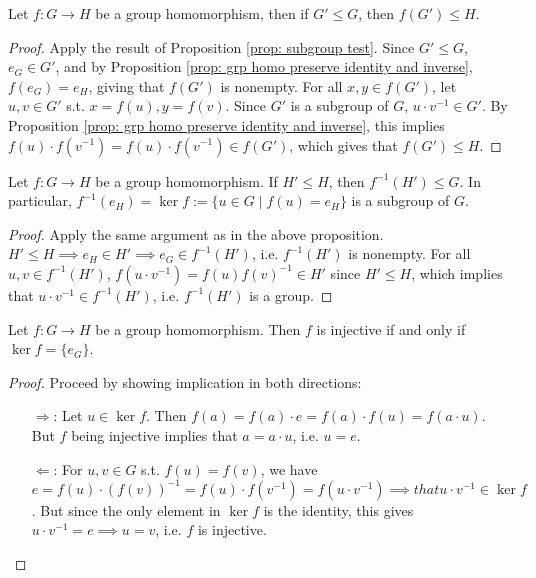 \begin{proposition}
    Let $f: G \to H$ be a group homomorphism, then if $G' \leq G$, then $f(G') \leq H$.
\end{proposition}

\begin{proof}
    Apply the result of Proposition \ref{prop: subgroup test}. Since $G' \leq G$, $e_G \in G'$, and by Proposition \ref{prop: grp homo preserve identity and inverse}, $f(e_G) = e_H$, giving that $f(G')$ is nonempty. For all $x, y \in f(G')$, let $u, v \in G'$ s.t. $x = f(u), y = f(v)$. Since $G'$ is a subgroup of $G$, $u\cdot v^{-1} \in G'$. By Proposition \ref{prop: grp homo preserve identity and inverse}, this implies $f(u) \cdot f(v^{-1}) = f(u) \cdot f(v^{-1}) \in f(G')$, which gives that $f(G') \leq H$.
\end{proof}

\begin{proposition}\label{prop: kernel gives a subgroup}
    Let $f: G \to H$ be a group homomorphism. If $H' \leq H$, then $f^{-1} (H') \leq G$. In particular, $f^{-1}(e_H) = \ker f := \{u \in G \mid f(u) = e_H\}$ is a subgroup of $G$.
\end{proposition}

\begin{proof}
    Apply the same argument as in the above proposition. $H' \leq H \implies e_H \in H' \implies e_G \in f^{-1}(H')$, i.e. $f^{-1}(H')$ is nonempty. For all $u, v \in f^{-1}(H')$, $f(u\cdot v^{-1}) = f(u) f(v)^{-1} \in H'$ since $H' \leq H$, which implies that $u \cdot v^{-1} \in f^{-1}(H')$, i.e. $f^{-1}(H')$ is a group. 
\end{proof}

\begin{proposition}
    Let $f: G \to H$ be a group homomorphism. Then $f$ is injective if and only if $\ker f = \{e_G\}$.
\end{proposition}

\begin{proof}
    Proceed by showing implication in both directions:
    \begin{enumerate}
        \item[$\Rightarrow$:] Let $u \in \ker f$. Then $f(a) = f(a) \cdot e = f(a) \cdot f(u) = f(a \cdot u)$. But $f$ being injective implies that $a = a\cdot u$, i.e. $u = e$.
        \item[$\Leftarrow$:] For $u, v \in G$ s.t. $f(u) = f(v)$, we have $e = f(u) \cdot (f(v))^{-1} = f(u) \cdot f(v^{-1}) = f(u \cdot v^{-1}) \implies that u \cdot v^{-1} \in \ker f$. But since the only element in $\ker f$ is the identity, this gives $u \cdot v^{-1} = e \implies u = v$, i.e. $f$ is injective.
    \end{enumerate}
\end{proof}

